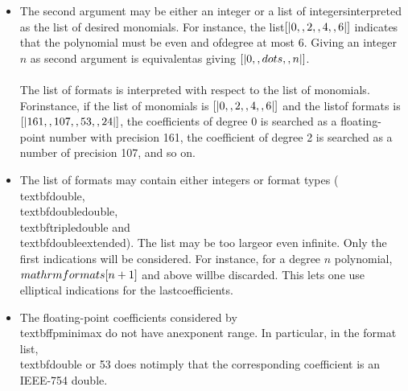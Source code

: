 \begin{itemize}
\item The second argument may be either an integer or a list of integers\n   interpreted as the list of desired monomials. For instance, the list\n   $[|0,\\,2,\\,4,\\,6|]$ indicates that the polynomial must be even and of\n   degree at most 6. Giving an integer $n$ as second argument is equivalent\n   as giving $[|0,\\,\\dots,\\,n|]$.\\\\\n   The list of formats is interpreted with respect to the list of monomials. For\n   instance, if the list of monomials is $[|0,\\,2,\\,4,\\,6|]$ and the list\n   of formats is $[|161,\\,107,\\,53,\\,24|]$, the coefficients of degree 0 is \n   searched as a floating-point number with precision 161, the coefficient of \n   degree 2 is searched as a number of precision 107, and so on.\n
\item The list of formats may contain either integers or format types (\\textbf{double},\n   \\textbf{doubledouble}, \\textbf{tripledouble} and \\textbf{doubleextended}). The list may be too large\n   or even infinite. Only the first indications will be considered. For \n   instance, for a degree $n$ polynomial, $\\mathrm{formats}[n+1]$ and above will\n   be discarded. This lets one use elliptical indications for the last\n   coefficients.\n
\item The floating-point coefficients considered by \\textbf{fpminimax} do not have an\n   exponent range. In particular, in the format list, \\textbf{double} or 53 does not\n   imply that the corresponding coefficient is an IEEE-754 double.\n

\end{itemize}

